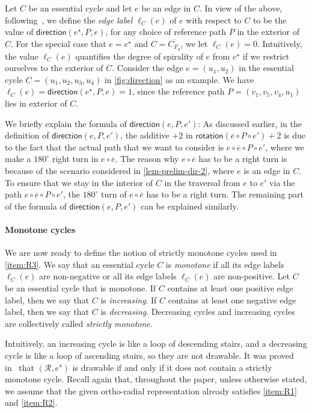 \documentclass{theoretics}
\newcommand{\RR}{\mathcal{R}}
\newcommand{\FO}{F_\mathsf{o}}
\newcommand{\rotation}{\mathsf{rotation}}
\newcommand{\direction}{\mathsf{direction}}
\newcommand{\eref}{e^\star}
\begin{document}
Let $C$ be an essential cycle and let $e$ be an edge in $C$.
In view of the above, following~\cite{barth2023topology}, we define the \emph{edge label} $\ell_C(e)$ of $e$ with respect to $C$ to be the value of $\direction(\eref, P, e)$, for any choice of reference path $P$ in the exterior of $C$. For the special case that $e = \eref$ and $C = \overline{C_{\FO}}$, we let $\ell_C(e) = 0$. Intuitively, the value $\ell_C(e)$ quantifies the degree of spirality of $e$ from $\eref$ if we restrict ourselves to the exterior of $C$.
Consider the edge $e=(u_1, u_2)$ in the essential cycle $C = (u_1, u_2, u_3, u_4)$ in \cref{fig:direction} as an example. We have $\ell_C(e) = \direction(\eref, P, e) = 1$, since the reference path $P=(v_1, v_5, v_4, u_1)$ lies in exterior of $C$. 

We briefly explain the formula of $\direction(e, P, e')$: As discussed earlier, in the definition of  $\direction(e, P, e')$, the additive $+2$ in $\rotation(\overline{e} \circ P \circ e')+2$ is due to the fact that the actual path that we want to consider is $e \circ \overline{e} \circ P \circ e'$, where we make a $180^\circ$ right turn in $e \circ \overline{e}$. The reason why $e \circ \overline{e}$ has to be a right turn is because of the scenario considered in \cref{lem-prelim-dir-2}, where $e$ is an edge in $C$.
To ensure that we stay in the interior of $C$ in the traversal from $e$ to $e'$ via the path $e \circ \overline{e} \circ P \circ e'$, the $180^\circ$ turn of $e \circ \overline{e}$ has to be a right turn. The remaining part of the formula of $\direction(e, P, e')$ can be explained similarly.

\paragraph{Monotone cycles}
We are now ready to define the notion of strictly monotone cycles used in \ref{item:R3}.
We say that an essential cycle $C$ is \emph{monotone} if all its edge labels $\ell_C(e)$ are non-negative or all its edge labels $\ell_C(e)$ are non-positive. 
Let $C$ be an essential cycle that is monotone.
If $C$ contains at least one positive edge label, then we say that $C$ is \emph{increasing}. If $C$ contains at least one negative edge label, then we say that $C$ is \emph{decreasing}. Decreasing cycles and increasing cycles are collectively called \emph{strictly monotone}.

Intuitively, an increasing cycle is like a loop of descending stairs, and a decreasing cycle is like a loop of ascending stairs, so they are not drawable.
It was proved in~\cite{barth2023topology} that $(\RR, \eref)$ is drawable if and only if it does not contain a strictly monotone cycle. Recall again that, throughout the paper, unless otherwise stated, we assume that the given ortho-radial representation already satisfies \ref{item:R1} and \ref{item:R2}.
\end{document}
